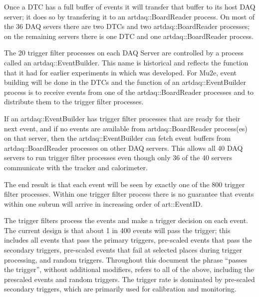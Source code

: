 Once a DTC has a full buffer of events it will transfer that buffer to its host DAQ server;
it does so by transfering it to an {\code artdaq::BoardReader} process.  On most of the
36 DAQ severs there are two DTCs and two {\code artdaq::BoardReader} processes;
on the remaining servers there is one DTC and one {\code artdaq::BoardReader} process.

The 20 trigger filter \art processes on each DAQ Server are controlled by a process
called an {\code artdaq::EventBuilder}.
This name is historical and reflects the function that it had for earlier experiments in which \artdaq was developed.
For Mu2e, event building will be done in the DTCs and the function of an
{\code artdaq::EventBuilder} process is to receive events from one of
the {\code artdaq::BoardReader} processes and to distribute them to the trigger filter \art processes.

If an {\code artdaq::EventBuilder} has trigger filter processes that are ready for their next event,
and if no events are available from {\code artdaq::BoardReader} process(es) on that server,
then the {\code artdaq::EventBuilder} can fetch event buffers from {\code artdaq::BoardReader} processes
on other DAQ servers.
This allows all 40 DAQ servers to run trigger filter processes even though only 36 of the 40 servers
communicate with the tracker and calorimeter.

The end result is that each event will be seen by exactly one of the 800 trigger filter processes.
Within one trigger filter process there is no guarantee that events within one subrun will arrive in
increasing order of {\code art::EventID}.


The trigger filters process the events and make a trigger decision on
each event.
The current design is that about 1 in 400 events will pass the trigger;
this includes all events that pass the primary triggers,
pre-scaled events that pass the secondary triggers,
pre-scaled events that fail at selected places during trigger processing,
and random triggers.
Throughout this document the phrase ``passes the trigger'', without additional modifiers,
refers to all of the above, including the prescaled events and random triggers.
The trigger rate is dominated by pre-scaled secondary triggers,
which are primarily used for calibration and monitoring.

